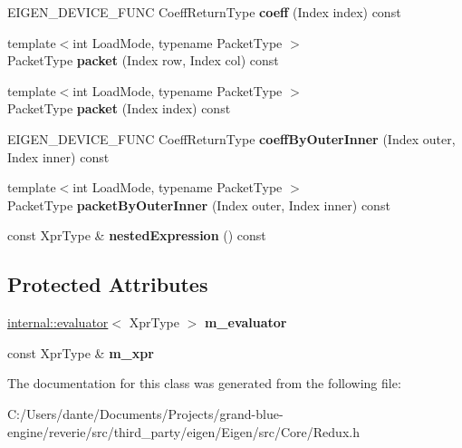 \begin{DoxyCompactItemize}
\mbox{\label{class_eigen_1_1internal_1_1redux__evaluator_ab0980858a25500e1c8fe8ce59960500a}} 
E\+I\+G\+E\+N\+\_\+\+D\+E\+V\+I\+C\+E\+\_\+\+F\+U\+NC Coeff\+Return\+Type {\bfseries coeff} (Index index) const
\item 
\mbox{\label{class_eigen_1_1internal_1_1redux__evaluator_a472d69c66fe1edee728666b67ebc401c}} 
{\footnotesize template$<$int Load\+Mode, typename Packet\+Type $>$ }\\Packet\+Type {\bfseries packet} (Index row, Index col) const
\item 
\mbox{\label{class_eigen_1_1internal_1_1redux__evaluator_a433d7cdb229ff7568e0d68b74b87985c}} 
{\footnotesize template$<$int Load\+Mode, typename Packet\+Type $>$ }\\Packet\+Type {\bfseries packet} (Index index) const
\item 
\mbox{\label{class_eigen_1_1internal_1_1redux__evaluator_a6d56217446293557a7b21754181fce85}} 
E\+I\+G\+E\+N\+\_\+\+D\+E\+V\+I\+C\+E\+\_\+\+F\+U\+NC Coeff\+Return\+Type {\bfseries coeff\+By\+Outer\+Inner} (Index outer, Index inner) const
\item 
\mbox{\label{class_eigen_1_1internal_1_1redux__evaluator_a438feca81b1846945bad96d2198b4bac}} 
{\footnotesize template$<$int Load\+Mode, typename Packet\+Type $>$ }\\Packet\+Type {\bfseries packet\+By\+Outer\+Inner} (Index outer, Index inner) const
\item 
\mbox{\label{class_eigen_1_1internal_1_1redux__evaluator_ae913efcd2894bb81aa1a04369722df32}} 
const Xpr\+Type \& {\bfseries nested\+Expression} () const
\end{DoxyCompactItemize}
\subsection*{Protected Attributes}
\begin{DoxyCompactItemize}
\item 
\mbox{\label{class_eigen_1_1internal_1_1redux__evaluator_adaad4ff2d8129d49fb3a33f4b2e6444d}} 
\mbox{\hyperlink{struct_eigen_1_1internal_1_1evaluator}{internal\+::evaluator}}$<$ Xpr\+Type $>$ {\bfseries m\+\_\+evaluator}
\item 
\mbox{\label{class_eigen_1_1internal_1_1redux__evaluator_a8e1c3b294a21c5bedaf3230e35a09f49}} 
const Xpr\+Type \& {\bfseries m\+\_\+xpr}
\end{DoxyCompactItemize}


The documentation for this class was generated from the following file\+:\begin{DoxyCompactItemize}
\item 
C\+:/\+Users/dante/\+Documents/\+Projects/grand-\/blue-\/engine/reverie/src/third\+\_\+party/eigen/\+Eigen/src/\+Core/Redux.\+h\end{DoxyCompactItemize}
